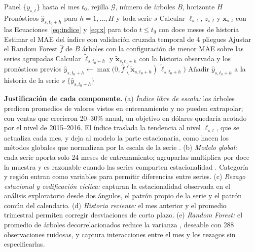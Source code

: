 \documentclass[pdflatex,sn-mathphys-num]{sn-jnl}
\begin{document}
\begin{algorithm}
\caption{Random Forest global sobre el índice de ventas y proyección recursiva}\label{alg:propuesto}
\begin{algorithmic}[1]
\Require Panel $\{y_{s,t}\}$ hasta el mes $t_0$, rejilla $\mathcal{G}$, número de árboles $B$, horizonte $H$
\Ensure Pronósticos $\hat{y}_{s,t_0+h}$ para $h=1,\dots,H$ y toda serie $s$
\State Calcular $\ell_{s,t}$, $z_{s,t}$ y $\mathbf{x}_{s,t}$ con las Ecuaciones~\eqref{eq:indice} y \eqref{eq:x} para todo $t\le t_0$ con doce meses de historia
    \State Estimar el MAE del índice con validación cruzada temporal de 4 pliegues
\EndFor
\State Ajustar el Random Forest $\hat{f}$ de $B$ árboles con la configuración de menor MAE sobre las series agrupadas
    \State Calcular $\tilde{\ell}_{s,t_0+h}$ y $\tilde{\mathbf{x}}_{s,t_0+h}$ con la historia observada y los pronósticos previos
    \State $\hat{y}_{s,t_0+h}\gets\max\bigl(0,\hat{f}(\tilde{\mathbf{x}}_{s,t_0+h})\,\tilde{\ell}_{s,t_0+h}\bigr)$
    \State Añadir $\hat{y}_{s,t_0+h}$ a la historia de la serie $s$
\EndFor
\State \Return $\{\hat{y}_{s,t_0+h}\}$
\end{algorithmic}
\end{algorithm}

\textbf{Justificación de cada componente.} (a) \emph{Índice libre de escala:} los árboles predicen promedios de valores vistos en entrenamiento y no pueden extrapolar; con ventas que crecieron 20--30\% anual, un objetivo en dólares quedaría acotado por el nivel de 2015--2016. El índice traslada la tendencia al nivel $\ell_{s,t}$, que se actualiza cada mes, y deja al modelo la parte estacionaria, como hacen los métodos globales que normalizan por la escala de la serie \cite{salinas2020,smyl2020}. (b) \emph{Modelo global:} cada serie aporta solo 24 meses de entrenamiento; agruparlas multiplica por doce la muestra y es razonable cuando las series comparten estacionalidad \cite{monteromanso2021}. Categoría y región entran como variables para permitir diferencias entre series. (c) \emph{Rezago estacional y codificación cíclica:} capturan la estacionalidad observada en el análisis exploratorio desde dos ángulos, el patrón propio de la serie y el patrón común del calendario. (d) \emph{Historia reciente:} el mes anterior y el promedio trimestral permiten corregir desviaciones de corto plazo. (e) \emph{Random Forest:} el promedio de árboles decorrelacionados reduce la varianza \cite{breiman2001}, deseable con 288 observaciones ruidosas, y captura interacciones entre el mes y los rezagos sin especificarlas.
\end{document}
